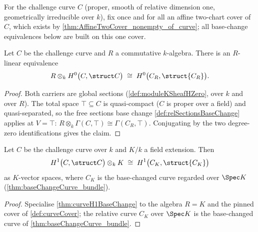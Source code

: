 \begin{definition}
  \label{def:curveCover}
  \leanok
  For the challenge curve \(C\) (proper, smooth of relative dimension one,
  geometrically irreducible over \(k\)), fix once and for all an affine two-chart cover
  of \(C\), which exists by \ref{thm:AffineTwoCover_nonempty_of_curve}; all base-change
  equivalences below are built on this one cover.
\end{definition}

\begin{theorem}
  \label{thm:curveH0BaseChange}
  \leanok
  Let \(C\) be the challenge curve and \(R\) a commutative \(k\)-algebra. There is an
  \(R\)-linear equivalence
  \[
    R \otimes_k H^0\bigl(C, \struct C\bigr) \;\cong\; H^0\bigl(C_R, \struct{C_R}\bigr).
  \]
\end{theorem}
\begin{proof}
  \leanok
  Both carriers are global sections (\ref{def:moduleKSheafHZero}, over \(k\) and over
  \(R\)). The total space \(\top \subseteq C\) is quasi-compact (\(C\) is proper over a
  field) and quasi-separated, so the free sections base change
  \ref{def:relSectionsBaseChange} applies at \(V = \top\):
  \(R \otimes_k \Gamma(C, \top) \cong \Gamma(C_R, \top)\). Conjugating by the two
  degree-zero identifications gives the claim.
\end{proof}

\begin{theorem}
  \label{thm:h1BaseFieldEquiv}
  \leanok
  Let \(C\) be the challenge curve over \(k\) and \(K/k\) a field extension. Then
  \[
    H^1\bigl(C, \struct C\bigr) \otimes_k K \;\cong\; H^1\bigl(C_K, \struct{C_K}\bigr)
  \]
  as \(K\)-vector spaces, where \(C_K\) is the base-changed curve regarded over
  \(\Spec K\) (\ref{thm:baseChangeCurve_bundle}).
\end{theorem}
\begin{proof}
  \leanok
  Specialise \ref{thm:curveH1BaseChange} to the algebra \(R = K\) and the pinned cover
  of \ref{def:curveCover}; the relative curve \(C_K\) over \(\Spec K\) is the
  base-changed curve of \ref{thm:baseChangeCurve_bundle}.
\end{proof}


